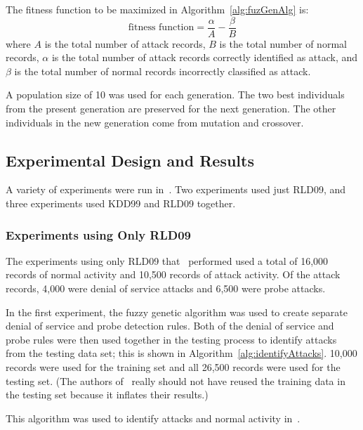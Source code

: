 \documentclass{sig-alternate}
\begin{document}
The fitness function to be maximized in Algorithm~\ref{alg:fuzGenAlg} is:
\begin{equation*}
\textrm{fitness function} = \frac{\alpha}{A} - \frac{\beta}{B}
\end{equation*}
where $A$ is the total number of attack records, $B$ is the total number of normal records, $\alpha$ is the total number of attack records correctly identified as attack, and $\beta$ is the total number of normal records incorrectly classified as attack.

A population size of 10 was used for each generation. The two best individuals from the present generation are preserved for the next generation. The other individuals in the new generation come from mutation and crossover.




\newpage





\subsection{Experimental Design and Results}
\label{sec:experimentalDesignResults}
A variety of experiments were run in~\cite{6496342, 6559603}. Two experiments used just RLD09, and three experiments used KDD99 and RLD09 together.

\subsubsection{Experiments using Only RLD09}
The experiments using only RLD09 that~\cite{6496342} performed used a total of 16,000 records of normal activity and 10,500 records of attack activity. Of the attack records, 4,000 were denial of service attacks and 6,500 were probe attacks.

In the first experiment, the fuzzy genetic algorithm was used to create separate denial of service and probe detection rules. Both of the denial of service and probe rules were then used together in the testing process to identify attacks from the testing data set; this is shown in Algorithm~\ref{alg:identifyAttacks}. 10,000 records were used for the training set and all 26,500 records were used for the testing set. (The authors of~\cite{6496342} really should not have reused the training data in the testing set because it inflates their results.)

\begin{algorithm}[t]
\caption{This algorithm was used to identify attacks and normal activity in~\cite{6496342}.}
\label{alg:identifyAttacks}
\begin{algorithmic}
\ELSE {}
\ENDIF
\end{algorithmic}
\end{algorithm}
\end{document}
